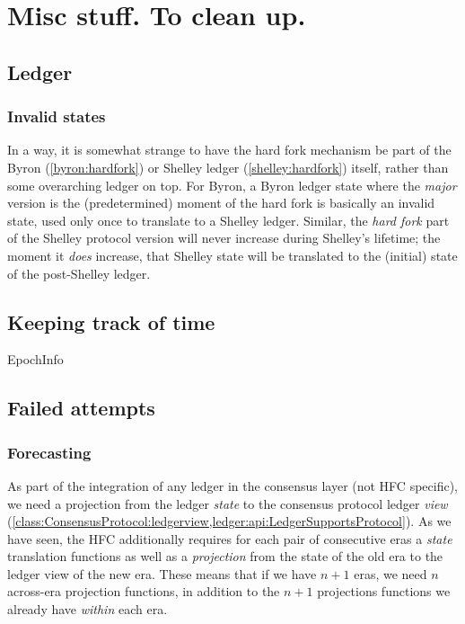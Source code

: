 \chapter{Misc stuff. To clean up.}
\label{hfc:misc}


\section{Ledger}

\subsection{Invalid states}
\label{hfc:ledger:invalid-states}

In a way, it is somewhat strange to have the hard fork mechanism be part of the
Byron (\cref{byron:hardfork}) or Shelley ledger (\cref{shelley:hardfork})
itself, rather than some overarching ledger on top. For Byron, a Byron ledger
state where the \emph{major} version is the (predetermined) moment of the hard
fork is basically an invalid state, used only once to translate to a Shelley
ledger. Similar, the \emph{hard fork} part of the Shelley protocol version will
never increase during Shelley's lifetime; the moment it \emph{does} increase,
that Shelley state will be translated to the (initial) state of the post-Shelley
ledger.

\section{Keeping track of time}
\label{hfc:time}

EpochInfo

\section{Failed attempts}

\subsection{Forecasting}

As part of the integration of any ledger in the consensus layer (not HFC
specific), we need a projection from the ledger \emph{state} to the consensus
protocol ledger \emph{view}
(\cref{class:ConsensusProtocol:ledgerview,ledger:api:LedgerSupportsProtocol}).
As we have seen,
the HFC additionally requires for each pair of consecutive eras a  \emph{state}
translation functions as well as a \emph{projection} from the state of the old
era to the ledger view of the new era. These means that if we have $n + 1$ eras,
we need $n$ across-era projection functions, in addition to the $n + 1$
projections functions we already have \emph{within} each era.

